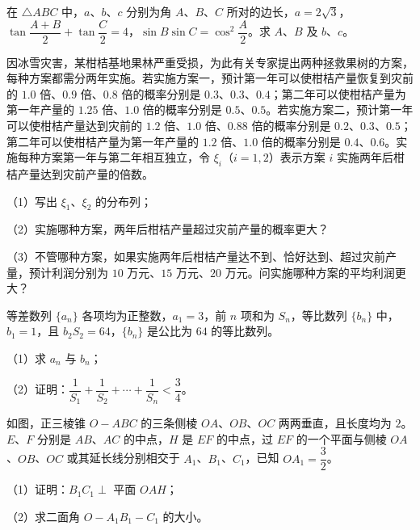 \begin{question}
在 $\triangle ABC$ 中，$a$、$b$、$c$ 分别为角 $A$、$B$、$C$ 所对的边长，$a=2\sqrt3$，$\tan\dfrac{A+B}2+\tan\dfrac C2=4$，$\sin B\sin C=\cos^2\dfrac A2$。求 $A$、$B$ 及 $b$、$c$。

\end{question}
\begin{question}
因冰雪灾害，某柑桔基地果林严重受损，为此有关专家提出两种拯救果树的方案，每种方案都需分两年实施。若实施方案一，预计第一年可以使柑桔产量恢复到灾前的 $1.0$ 倍、$0.9$ 倍、$0.8$ 倍的概率分别是 $0.3$、$0.3$、$0.4$；第二年可以使柑桔产量为第一年产量的 $1.25$ 倍、$1.0$ 倍的概率分别是 $0.5$、$0.5$。若实施方案二，预计第一年可以使柑桔产量达到灾前的 $1.2$ 倍、$1.0$ 倍、$0.88$ 倍的概率分别是 $0.2$、$0.3$、$0.5$；第二年可以使柑桔产量为第一年产量的 $1.2$ 倍、$1.0$ 倍的概率分别是 $0.4$、$0.6$。实施每种方案第一年与第二年相互独立，令 $\xi_i$（$i=1,2$）表示方案 $i$ 实施两年后柑桔产量达到灾前产量的倍数。

（1）写出 $\xi_1$、$\xi_2$ 的分布列；

（2）实施哪种方案，两年后柑桔产量超过灾前产量的概率更大？

（3）不管哪种方案，如果实施两年后柑桔产量达不到、恰好达到、超过灾前产量，预计利润分别为 $10$ 万元、$15$ 万元、$20$ 万元。问实施哪种方案的平均利润更大？

\end{question}
\begin{question}
等差数列 $\{a_n\}$ 各项均为正整数，$a_1=3$，前 $n$ 项和为 $S_n$，等比数列 $\{b_n\}$ 中，$b_1=1$，且 $b_2S_2=64$，$\{b_n\}$ 是公比为 $64$ 的等比数列。

（1）求 $a_n$ 与 $b_n$；

（2）证明：$\dfrac1{S_1}+\dfrac1{S_2}+\cdots+\dfrac1{S_n}<\dfrac34$。

\Needspace{0.4\textheight}
\end{question}
\begin{question}
如图，正三棱锥 $O-ABC$ 的三条侧棱 $OA$、$OB$、$OC$ 两两垂直，且长度均为 $2$。$E$、$F$ 分别是 $AB$、$AC$ 的中点，$H$ 是 $EF$ 的中点，过 $EF$ 的一个平面与侧棱 $OA$、$OB$、$OC$ 或其延长线分别相交于 $A_1$、$B_1$、$C_1$，已知 $OA_1=\dfrac32$。

（1）证明：$B_1C_1\perp$ 平面 $OAH$；

（2）求二面角 $O-A_1B_1-C_1$ 的大小。
\nopagebreak[4]
\begin{center}\end{center}
\nopagebreak[4]
\Needspace{0.4\textheight}
\end{question}
